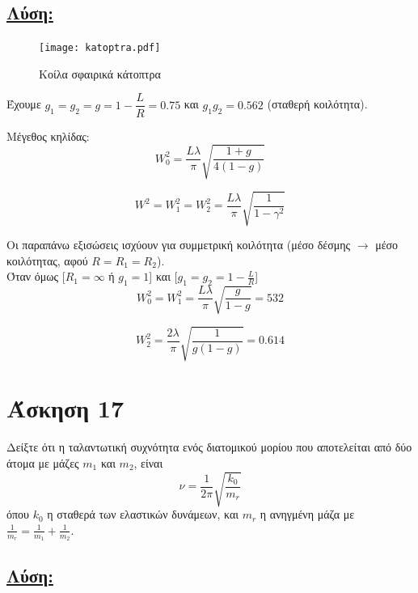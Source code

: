 \documentclass[a4paper,11pt,titlepage]{article}
\numberwithin{equation}{section} %
\begin{document}
\subsection*{\underline{Λύση:}}

\begin{figure}[!h]
\centering
\texttt{[image: katoptra.pdf]}\\[0.3cm]
\caption{Κοίλα σφαιρικά κάτοπτρα}
\end{figure}

Έχουμε $g_1=g_2=g=1-\dfrac{L}{R}=0.75$ και $g_1g_2=0.562$ (σταθερή κοιλότητα).

Μέγεθος κηλίδας:
\begin{equation}
 W_0^2=\frac{L\lambda}{\pi}\sqrt{\dfrac{1+g}{4(1-g)}}
\end{equation}

\begin{equation}
 W^2=W_1^2=W_2^2=\frac{L\lambda}{\pi}\sqrt{\dfrac{1}{1-\gamma^2}}
\end{equation}

Οι παραπάνω εξισώσεις ισχύουν για συμμετρική κοιλότητα (μέσο δέσμης $\rightarrow$ μέσο κοιλότητας, αφού $R=R_1=R_2$). \\
Όταν όμως [$R_1=\infty$ ή $g_1=1$] και [$g_1=g_2=1-\frac{L}{R}$]
\\[0.5cm]

\begin{equation} 
 W_0^2=W_1^2=\frac{L\lambda}{\pi}\sqrt{\frac{g}{1-g}}=532
\end{equation} 

\begin{equation} 
 W_2^2=\frac{2\lambda}{\pi}\sqrt{\frac{1}{g(1-g)}}=0.614
\end{equation} 

\newpage
\section{Άσκηση 17}

Δείξτε ότι η ταλαντωτική συχνότητα ενός διατομικού μορίου που αποτελείται από δύο άτομα με μάζες $m_1$ και $m_2$, είναι 
\begin{equation}
\nu=\frac{1}{2\pi}\sqrt{\frac{k_0}{m_r}}
\end{equation}
όπου $k_0$ η σταθερά των ελαστικών δυνάμεων, και $m_r$ η ανηγμένη μάζα με $\frac{1}{m_r}=\frac{1}{m_1}+\frac{1}{m_2}$.

\subsection*{\underline{Λύση:}}
\end{document}
